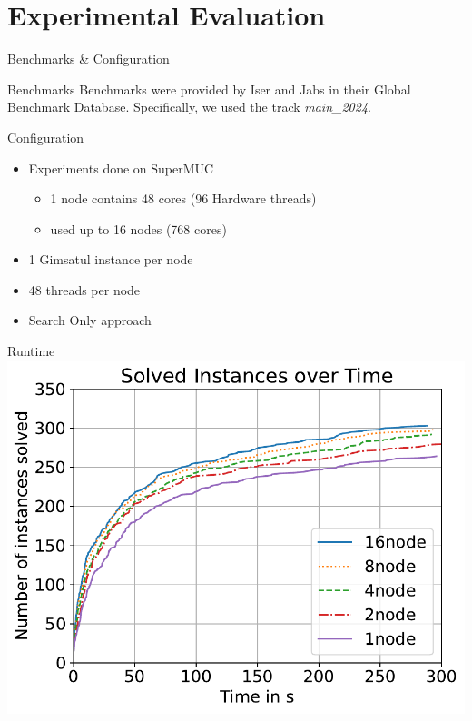 \documentclass[]{sdqbeamer}
\begin{document}
\section{Experimental Evaluation}
\begin{frame}{Benchmarks \& Configuration}
    \begin{block}{Benchmarks}
        Benchmarks were provided by Iser and Jabs in 
        their Global Benchmark Database. Specifically, 
        we used the track \textit{main\_2024}.
    \end{block}

    \begin{block}{Configuration}
        \begin{itemize}
            \item Experiments done on SuperMUC
            \begin{itemize}
                \item 1 node contains 48 cores (96 Hardware threads)
                \item used up to 16 nodes (768 cores)
            \end{itemize}
            \item 1 Gimsatul instance per node
            \item 48 threads per node
            \item Search Only approach
        \end{itemize}
    \end{block}
\end{frame}

\begin{frame}{Runtime}
    \center
    \includegraphics[scale=1]{plots/cumulative_runtime/scalability_gim.pdf}
\end{frame}
\end{document}

